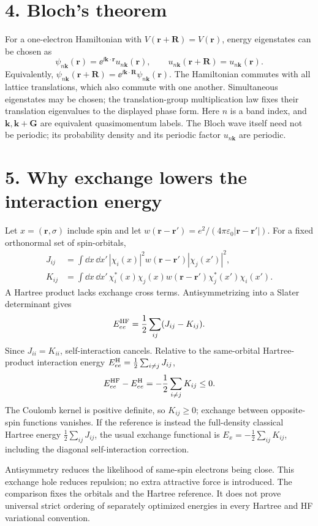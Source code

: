 \section*{4. Bloch's theorem}
For a one-electron Hamiltonian with $V(\mathbf r+\mathbf R)=V(\mathbf r)$, energy eigenstates can be chosen as
\[
\boxed{\psi_{n\mathbf k}(\mathbf r)=\ee^{\ii\mathbf k\cdot\mathbf r}
u_{n\mathbf k}(\mathbf r),\qquad
u_{n\mathbf k}(\mathbf r+\mathbf R)=u_{n\mathbf k}(\mathbf r).}
\]
Equivalently, $\psi_{n\mathbf k}(\mathbf r+\mathbf R)=
\ee^{\ii\mathbf k\cdot\mathbf R}\psi_{n\mathbf k}(\mathbf r)$.
The Hamiltonian commutes with all lattice translations, which also commute with one another. Simultaneous eigenstates may be chosen; the translation-group multiplication law fixes their translation eigenvalues to the displayed phase form. Here $n$ is a band index, and $\mathbf k,\mathbf k+\mathbf G$ are equivalent quasimomentum labels. The Bloch wave itself need not be periodic; its probability density and its periodic factor $u_{n\mathbf k}$ are periodic.

\section*{5. Why exchange lowers the interaction energy}
Let $x=(\mathbf r,\sigma)$ include spin and let $w(\mathbf r-\mathbf r')=e^2/(4\pi\varepsilon_0|\mathbf r-\mathbf r'|)$. For a fixed orthonormal set of spin-orbitals,
\begin{align*}
J_{ij}&=\int\dd x\,\dd x'\,|\chi_i(x)|^2w(\mathbf r-\mathbf r')|\chi_j(x')|^2,\\
K_{ij}&=\int\dd x\,\dd x'\,\chi_i^*(x)\chi_j(x)
w(\mathbf r-\mathbf r')\chi_j^*(x')\chi_i(x').
\end{align*}
A Hartree product lacks exchange cross terms. Antisymmetrizing into a Slater determinant gives
\[
E^{\rm HF}_{ee}=\frac12\sum_{ij}(J_{ij}-K_{ij}).
\]
Since $J_{ii}=K_{ii}$, self-interaction cancels. Relative to the same-orbital Hartree-product interaction energy $E^{\rm H}_{ee}=\tfrac12\sum_{i\ne j}J_{ij}$,
\[
E^{\rm HF}_{ee}-E^{\rm H}_{ee}=-\frac12\sum_{i\ne j}K_{ij}\leq0.
\]
The Coulomb kernel is positive definite, so $K_{ij}\geq0$; exchange between opposite-spin functions vanishes. If the reference is instead the full-density classical Hartree energy $\tfrac12\sum_{ij}J_{ij}$, the usual exchange functional is $E_x=-\tfrac12\sum_{ij}K_{ij}$, including the diagonal self-interaction correction.

Antisymmetry reduces the likelihood of same-spin electrons being close. This exchange hole reduces repulsion; no extra attractive force is introduced. The comparison fixes the orbitals and the Hartree reference. It does not prove universal strict ordering of separately optimized energies in every Hartree and HF variational convention.

